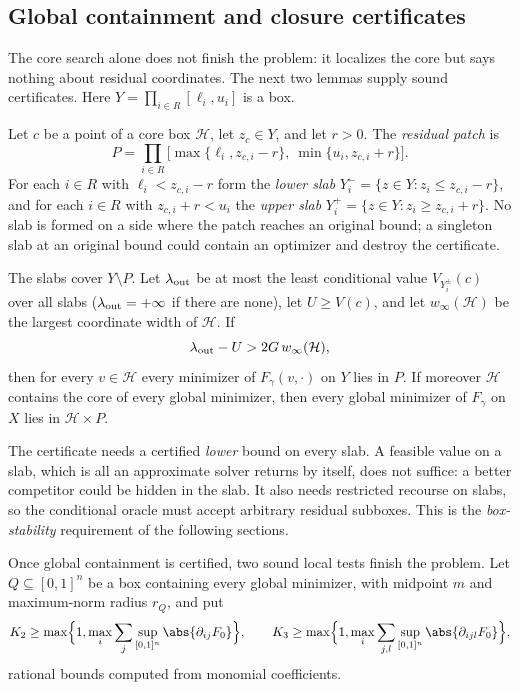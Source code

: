 \subsection{Global containment and closure certificates}\label{sec:rec:certificates}

The core search alone does not finish the problem: it localizes the core but
says nothing about residual coordinates. The next two lemmas supply sound
certificates. Here $Y=\prod_{i\in R}[\ell_i,u_i]$ is a box.

Let $c$ be a point of a core box $\mathcal H$, let $z_c\in Y$, and let $r>0$.
The \emph{residual patch} is
\[
 P=\prod_{i\in R}\bigl[\max\{\ell_i,z_{c,i}-r\},\ \min\{u_i,z_{c,i}+r\}\bigr].
\]
For each $i\in R$ with $\ell_i<z_{c,i}-r$ form the \emph{lower slab}
$Y_i^-=\{z\in Y:z_i\le z_{c,i}-r\}$, and for each $i\in R$ with
$z_{c,i}+r<u_i$ the \emph{upper slab} $Y_i^+=\{z\in Y:z_i\ge z_{c,i}+r\}$.
No slab is formed on a side where the patch reaches an original bound; a
singleton slab at an original bound could contain an optimizer and destroy
the certificate.

\begin{lemma}\label{lem:rec:exclusion}
The slabs cover $Y\setminus P$. Let $\lambda_{\rm out}$ be at most the least
conditional value $V_{Y_i^\pm}(c)$ over all slabs ($\lambda_{\rm out}=+\infty$
if there are none), let $U\ge V(c)$, and let $w_\infty(\mathcal H)$ be the
largest coordinate width of $\mathcal H$. If
\begin{equation}\label{eq:rec:exclusion}
 \lambda_{\rm out}-U>2G\,w_\infty(\mathcal H),
\end{equation}
then for every $v\in\mathcal H$ every minimizer of $F_\gamma(v,\cdot)$ on $Y$
lies in $P$. If moreover $\mathcal H$ contains the core of every global
minimizer, then every global minimizer of $F_\gamma$ on $X$ lies in
$\mathcal H\times P$.
\end{lemma}

The certificate needs a certified \emph{lower} bound on every slab. A
feasible value on a slab, which is all an approximate solver returns by
itself, does not suffice: a better competitor could be hidden in the slab.
It also needs restricted recourse on slabs, so the conditional oracle must
accept arbitrary residual subboxes. This is the \emph{box-stability}
requirement of the following sections.

Once global containment is certified, two sound local tests finish the
problem. Let $Q\subseteq[0,1]^n$ be a box containing every global
minimizer, with midpoint $m$ and maximum-norm radius $r_Q$, and put
\begin{equation}\label{eq:rec:K}
 K_2\ge\max\Bigl\{1,\max_i\sum_j\sup_{[0,1]^n}\abs{\partial_{ij}F_0}\Bigr\},
 \qquad
 K_3\ge\max\Bigl\{1,\max_i\sum_{j,l}\sup_{[0,1]^n}\abs{\partial_{ijl}F_0}\Bigr\},
\end{equation}
rational bounds computed from monomial coefficients.

